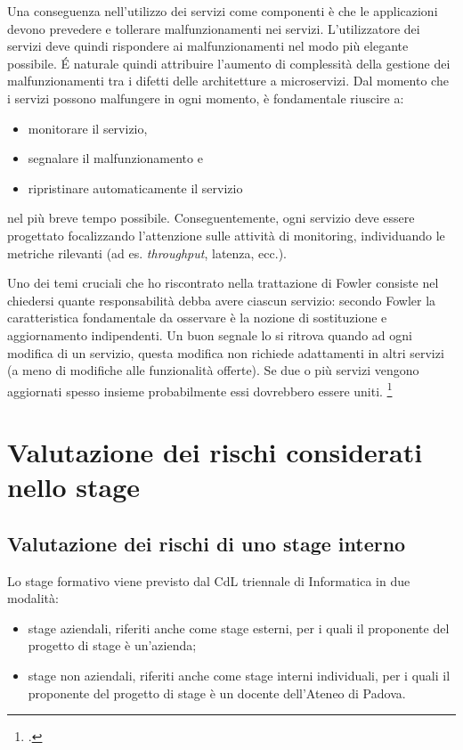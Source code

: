 Una conseguenza nell'utilizzo dei servizi come componenti è che le applicazioni devono prevedere e tollerare malfunzionamenti nei servizi. L'utilizzatore dei servizi deve quindi rispondere ai malfunzionamenti nel modo più elegante possibile.
É naturale quindi attribuire l'aumento di complessità della gestione dei malfunzionamenti tra i difetti delle architetture a microservizi.
Dal momento che i servizi possono malfungere in ogni momento, è fondamentale riuscire a:

\begin{itemize}
  \item monitorare il servizio,
  \item segnalare il malfunzionamento e
  \item ripristinare automaticamente il servizio
\end{itemize}
nel più breve tempo possibile. Conseguentemente, ogni servizio deve essere progettato focalizzando l'attenzione sulle attività di monitoring, individuando le metriche rilevanti (ad es. \emph{throughput}, latenza, ecc.).

Uno dei temi cruciali che ho riscontrato nella trattazione di Fowler consiste nel chiedersi quante responsabilità debba avere ciascun servizio: secondo Fowler la caratteristica fondamentale da osservare è la nozione di sostituzione e aggiornamento indipendenti.
Un buon segnale lo si ritrova quando ad ogni modifica di un servizio, questa modifica non richiede adattamenti in altri servizi (a meno di modifiche alle funzionalità offerte).
Se due o più servizi vengono aggiornati spesso insieme probabilmente essi dovrebbero essere uniti.
\footcite{site:fowler-microservices}

\pagebreak
\section{Valutazione dei rischi considerati nello stage}

\subsection{Valutazione dei rischi di uno stage interno}

Lo stage formativo viene previsto dal CdL triennale di Informatica in due modalità:
\begin{itemize}
  \item stage aziendali, riferiti anche come stage esterni, per i quali il proponente del progetto di stage è un'azienda;
  \item stage non aziendali, riferiti anche come stage interni individuali, per i quali il proponente del progetto di stage è un docente dell'Ateneo di Padova.
\end{itemize}


